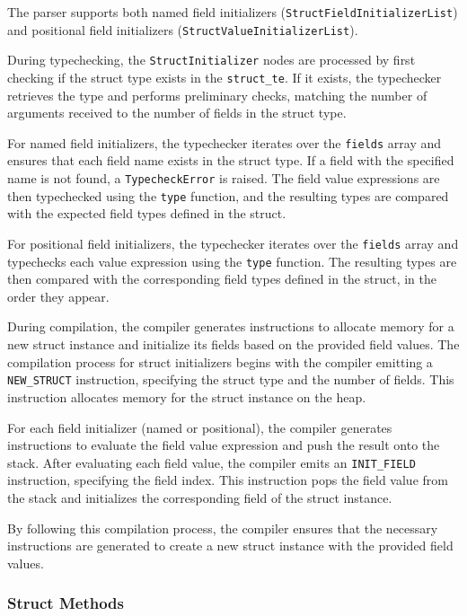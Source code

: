 \documentclass{report}
\begin{document}
The parser supports both named field initializers (\texttt{StructFieldInitializerList}) and positional field initializers (\texttt{StructValueInitializerList}). 

During typechecking, the \texttt{StructInitializer} nodes are processed by first checking if the struct type exists in the \texttt{struct\_te}. If it exists, the typechecker retrieves the type and performs preliminary checks, matching the number of arguments received to the number of fields in the struct type.

For named field initializers, the typechecker iterates over the \texttt{fields} array and ensures that each field name exists in the struct type. If a field with the specified name is not found, a \texttt{TypecheckError} is raised. The field value expressions are then typechecked using the \texttt{type} function, and the resulting types are compared with the expected field types defined in the struct.

For positional field initializers, the typechecker iterates over the \texttt{fields} array and typechecks each value expression using the \texttt{type} function. The resulting types are then compared with the corresponding field types defined in the struct, in the order they appear.

During compilation, the compiler generates instructions to allocate memory for a new struct instance and initialize its fields based on the provided field values. The compilation process for struct initializers begins with the compiler emitting a \texttt{NEW\_STRUCT} instruction, specifying the struct type and the number of fields. This instruction allocates memory for the struct instance on the heap.

For each field initializer (named or positional), the compiler generates instructions to evaluate the field value expression and push the result onto the stack. After evaluating each field value, the compiler emits an \texttt{INIT\_FIELD} instruction, specifying the field index. This instruction pops the field value from the stack and initializes the corresponding field of the struct instance.

By following this compilation process, the compiler ensures that the necessary instructions are generated to create a new struct instance with the provided field values.

\subsubsection{Struct Methods}
\end{document}
